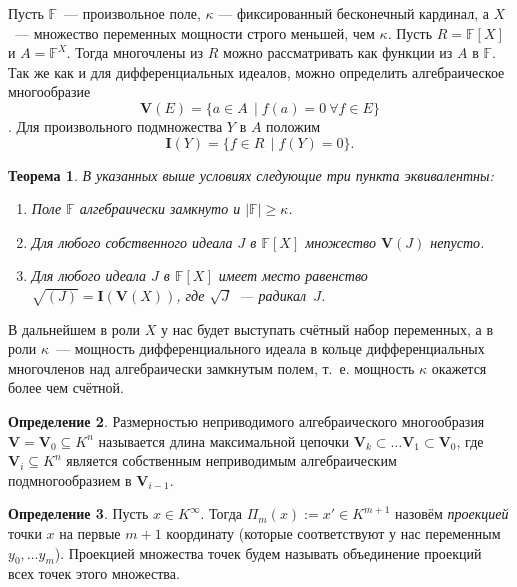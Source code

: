 \documentclass[16pt]{article}
\theoremstyle{plain}
\newtheorem{theorem}{Теорема}
\theoremstyle{definition}
\newtheorem{definition}[theorem]{Определение}
\theoremstyle{remark}
\begin{document}
Пусть $\mathbb{F}$~--- произвольное поле, $\kappa$ --- фиксированный
бесконечный кардинал, а $X$~--- множество переменных мощности строго
меньшей, чем $\kappa$. Пусть $R=\mathbb{F}[X]$ и $A=\mathbb{F}^X$. Тогда многочлены из
$R$ можно рассматривать как функции из $A$ в $\mathbb{F}$. Так же как и для
дифференциальных идеалов, можно определить алгебраическое многообразие $$\mathbf{V}(E)=\{a\in A\,
\mid f(a)=0~\forall f\in E\}$$. Для произвольного подмножества $Y$
в $A$ положим
$$
 \mathbf{I}(Y)=\{f \in R\, \mid f(Y)=0\}.
$$

\begin{theorem}\label{theorem:th 0 for alg}
В указанных выше условиях следующие три пункта эквивалентны:

\begin{enumerate}
\item Поле $\mathbb{F}$ алгебраически замкнуто и $|\mathbb{F}|\geqslant\kappa$.

\item Для любого собственного идеала $J$ в $\mathbb{F}[X]$ множество
$\mathbf{V}(J)$ непусто.

\item Для любого идеала $J$ в $\mathbb{F}[X]$ имеет место равенство
$\sqrt{(J)}=\mathbf{I}(\mathbf{V}(X))$, где $\sqrt{J}$~--- радикал~$J$.
\end{enumerate}

\end{theorem}

В дальнейшем в роли $X$ у нас будет выступать счётный набор
переменных, а в роли $\kappa$~--- мощность дифференциального идеала
в кольце дифференциальных многочленов
над алгебраически замкнутым полем, т.~е. мощность $\kappa$
окажется более чем счётной.


\begin{definition} Размерностью неприводимого алгебраического многообразия
$\mathbf{V}=\mathbf{V}_0\subseteq K^n$ называется длина максимальной цепочки
$\mathbf{V}_k\subset\ldots\mathbf{V}_1\subset\mathbf{V}_0$, где
$\mathbf{V}_i\subseteq K^n$ является собственным неприводимым алгебраическим подмногообразием
в $\mathbf{V}_{i-1}$.
\end{definition}

\begin{definition}
Пусть $x\in K^{\infty}$. Тогда $\Pi_m(x):=x'\in K^{m+1}$ назовём \emph{проекцией}
точки $x$ на первые $m+1$ координату (которые соответствуют у нас
переменным $y_0,\ldots y_m$). Проекцией множества точек будем называть объединение проекций всех точек этого множества.
\end{definition}
\end{document}
